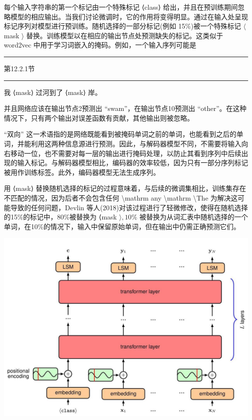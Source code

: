 \documentclass[10pt]{report}
\newcommand{\HRule}{\begin{center}\rule{0.9\linewidth}{0.2mm}\end{center}}
\begin{document}
每个输入字符串的第一个标记由一个特殊标记 ⟨class⟩ 给出，并且在预训练期间忽略模型的相应输出。当我们讨论微调时，它的作用将变得明显。通过在输入处呈现标记序列对模型进行预训练。随机选择的一部分标记(例如 15\%)被一个特殊标记 \(\langle\) mask \(\rangle\) 替换。训练模型以在相应的输出节点处预测缺失的标记。这类似于 word2vec 中用于学习词嵌入的掩码。例如，一个输入序列可能是

\HRule

第12.2.1节

\HRule

我 ⟨mask⟩ 过河到了 ⟨mask⟩ 岸。

并且网络应该在输出节点2预测出 “swam”，在输出节点10预测出 “other”。在这种情况下，只有两个输出对误差函数有贡献，其他输出则被忽略。

“双向” 这一术语指的是网络既能看到被掩码单词之前的单词，也能看到之后的单词，并能利用这两种信息源进行预测。因此，与解码器模型不同，不需要将输入向右移动一位，也不需要对每一层的输出进行掩码处理，以防止其看到序列中后续出现的输入标记。与解码器模型相比，编码器的效率较低，因为只有一部分序列标记被用作训练标签。此外，编码器模型无法生成序列。

用 ⟨mask⟩ 替换随机选择的标记的过程意味着，与后续的微调集相比，训练集存在不匹配的情况，因为后者不会包含任何  \textbackslash mathrm any  \textbackslash mathrm \textbackslash The 为解决这可能导致的任何问题，Devlin 等人(2018)对该过程进行了轻微修改，使得在随机选择的15\%的标记中，80\%被替换为 ⟨mask \(\rangle ,{10}\%\) 被替换为从词汇表中随机选择的一个单词，在10\%的情况下，输入中保留原始单词，但在输出中仍需正确预测它们。

\begin{center}
\includegraphics[max width=1.0\textwidth]{images/0194e279-9b28-703a-88f4-c3ac21e2010d_408_285_312_1264_924_0.jpg}
\end{center}
\hspace*{3em} 
\end{document}
